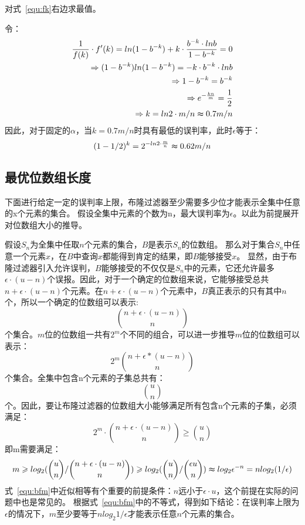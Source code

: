 对式~\ref{equ:fk}右边求最值。

令：
\begin{equation}
\begin{split}
\frac{1}{f(k)}\cdot f'(k) = ln(1 - b^{-k}) + k\cdot \frac{b^{-k}\cdot lnb}{1 - b^{-k}} = 0 \\
\Rightarrow (1 - b^{-k}) ln(1 - b^{-k}) = -k\cdot b^{-k}\cdot lnb \\
\Rightarrow 1 - b^{-k} = b^{-k} \\
\Rightarrow e^{-\frac{kn}{m}} = \frac{1}{2}\\
\Rightarrow k = ln2\cdot {m/n} \thickapprox 0.7{m/n}
\end{split}
\end{equation}
因此，对于固定的$\alpha$，当$k = 0.7{m/n}$时具有最低的误判率，此时$\epsilon$等于：
\begin{equation}
(1 - {1/2})^k = 2^{-ln2\cdot\frac{m}{n}} \thickapprox 0.62{m/n}
\end{equation}

\subsection{最优位数组长度}
\label{sec:opt_m}
下面进行给定一定的误判率上限，布隆过滤器至少需要多少位才能表示全集中任意的x个元素的集合。
假设全集中元素的个数为n，最大误判率为$\epsilon$。以此为前提展开对位数组大小的推导。

假设$S_n$为全集中任取$n$个元素的集合，$B$是表示$S_n$的位数组。
那么对于集合$S_n$中任意一个元素$x$，在$B$中查询$x$都能得到肯定的结果，即$B$能够接受$x$。
显然，由于布隆过滤器引入允许误判，$B$能够接受的不仅仅是$S_n$中的元素，它还允许最多$\epsilon \cdot(u - n)$个误报。因此，对于一个确定的位数组来说，它能够接受总共$n +\epsilon\cdot(u - n)$个元素。在$n + \epsilon\cdot(u - n)$个元素中，$B$真正表示的只有其中$n$个，所以一个确定的位数组可以表示:
\begin{equation}
\binom{n + \epsilon \cdot(u - n)}{n}
\end{equation}
个集合。$m$位的位数组一共有$2^m$个不同的组合，可以进一步推导$m$位的位数组可以表示：
\begin{equation}
2^m\binom{n + \epsilon *\left(u - n\right)}{n}
\end{equation}
个集合。全集中包含n个元素的子集总共有：
\begin{equation}
\binom{u}{n}
\end{equation}
个。因此，要让布隆过滤器的位数组大小能够满足所有包含n个元素的子集，必须满足：
\begin{equation}
2^m\cdot\binom{n + \epsilon \cdot(u - n)}{n} \geq \binom{u}{n}
\end{equation}
即m需要满足：
\begin{equation}
m \geq log_2({\binom{u}{n}/\binom{n + \epsilon \cdot(u - n)}{n}}) \geq log_2({\binom{u}{n}/\binom{\epsilon u}{n}}) \thickapprox log_2\epsilon^{-n} = n log_2({1/\epsilon})
\label{equ:bfm}
\end{equation}
式~\ref{equ:bfm}中近似相等有个重要的前提条件：$n$远小于$\epsilon\cdot u$，这个前提在实际的问题中也是常见的。
根据式~\ref{equ:bfm}中的不等式，得到如下结论：在误判率上限为$\epsilon$的情况下，$m$至少要等于$nlog_2{1/\epsilon}$才能表示任意$n$个元素的集合。

